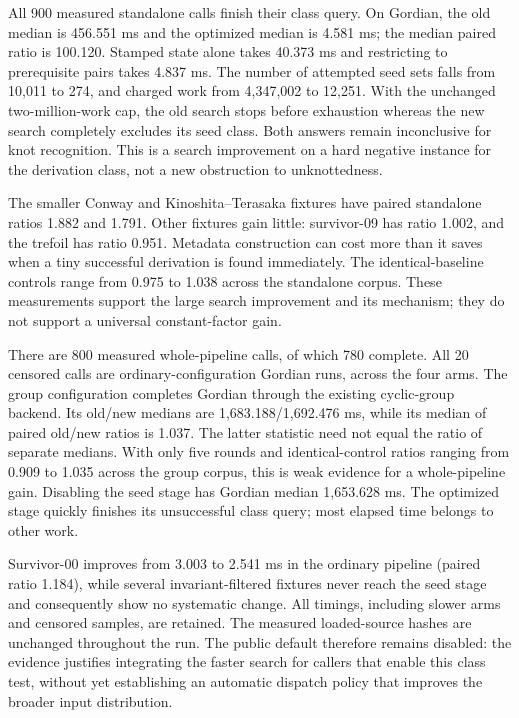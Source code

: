 All 900 measured standalone calls finish their class query. On Gordian,
the old median is 456.551 ms and the optimized median is 4.581 ms; the
median paired ratio is 100.120. Stamped state alone takes 40.373 ms and
restricting to prerequisite pairs takes 4.837 ms. The number of attempted
seed sets falls from 10,011 to 274, and charged work from 4,347,002 to
12,251. With the unchanged two-million-work cap, the old search stops
before exhaustion whereas the new search completely excludes its seed
class. Both answers remain inconclusive for knot recognition. This is a
search improvement on a hard negative instance for the derivation class,
not a new obstruction to unknottedness.

The smaller Conway and Kinoshita--Terasaka fixtures have paired standalone
ratios 1.882 and 1.791. Other fixtures gain little: survivor-09 has ratio
1.002, and the trefoil has ratio 0.951. Metadata construction can cost more
than it saves when a tiny successful derivation is found immediately.
The identical-baseline controls range from 0.975 to 1.038 across the
standalone corpus. These measurements support the large search improvement
and its mechanism; they do not support a universal constant-factor gain.

There are 800 measured whole-pipeline calls, of which 780 complete. All
20 censored calls are ordinary-configuration Gordian runs, across the four
arms. The group configuration completes Gordian through the existing
cyclic-group backend. Its old/new medians are 1,683.188/1,692.476 ms,
while its median of paired old/new ratios is 1.037. The latter statistic
need not equal the ratio of separate medians. With only five rounds and
identical-control ratios ranging from 0.909 to 1.035 across the group corpus,
this is weak evidence for a whole-pipeline gain. Disabling the seed stage
has Gordian median 1,653.628 ms. The optimized stage quickly finishes its
unsuccessful class query; most elapsed time belongs to other work.

Survivor-00 improves from 3.003 to 2.541 ms in the ordinary pipeline
(paired ratio 1.184), while several invariant-filtered fixtures never reach
the seed stage and consequently show no systematic change. All timings,
including slower arms and censored samples, are retained. The measured
loaded-source hashes are unchanged throughout the run. The public default
therefore remains disabled: the evidence justifies integrating the faster
search for callers that enable this class test, without yet establishing
an automatic dispatch policy that improves the broader input distribution.

